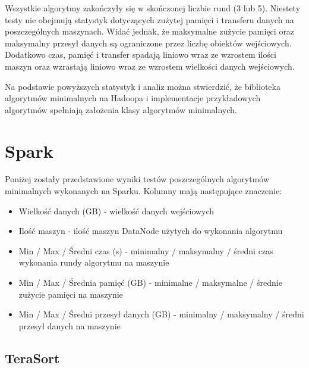 \documentclass[licencjacka]{pracamgr}
\begin{document}
Wszystkie algorytmy zakończyły się w skończonej liczbie rund (3 lub 5). Niestety testy nie obejmują statystyk dotyczących zużytej pamięci i transferu danych na poszczególnych maszynach. Widać jednak, że maksymalne zużycie pamięci oraz maksymalny przesył danych są ograniczone przez liczbę obiektów wejściowych. Dodatkowo czas, pamięć i transfer spadają liniowo wraz ze wzrostem ilości maszyn oraz wzrastają liniowo wraz ze wzrostem wielkości danych wejściowych.

Na podstawie powyższych statystyk i analiz można stwierdzić, że biblioteka algorytmów minimalnych na Hadoopa i implementacje przykładowych algorytmów spełniają założenia klasy algorytmów minimalnych.

\section{Spark}

Poniżej zostały przedstawione wyniki testów poszczególnych algorytmów minimalnych wykonanych na Sparku. Kolumny mają następujące znaczenie:
\begin{itemize}
    \item Wielkość danych (GB) - wielkość danych wejściowych
    \item Ilość maszyn - ilość maszyn DataNode użytych do wykonania algorytmu
    \item Min / Max / Średni czas (s) - minimalny / maksymalny / średni czas wykonania rundy algorytmu na maszynie
    \item Min / Max / Średnia pamięć (GB) - minimalne / maksymalne / średnie zużycie pamięci na maszynie 
    \item Min / Max / Średni przesył danych (GB) - minimalny / maksymalny / średni przesył danych na maszynie
\end{itemize}

\subsection{TeraSort}
\end{document}
